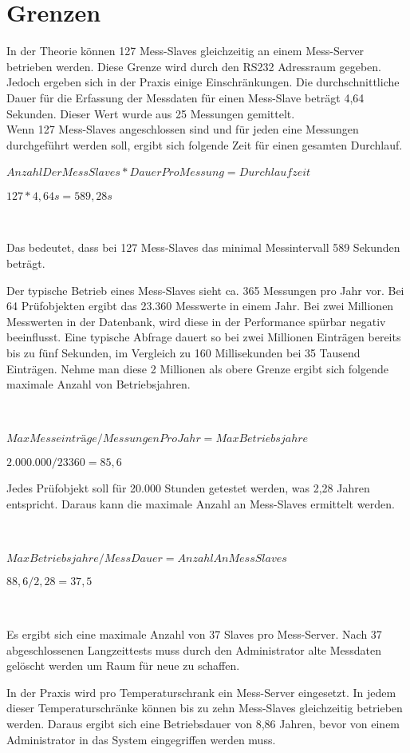 \section{Grenzen}

In der Theorie können 127 Mess-Slaves gleichzeitig an einem Mess-Server betrieben werden. Diese Grenze wird durch den RS232 Adressraum gegeben. Jedoch ergeben sich in der Praxis einige Einschränkungen. Die durchschnittliche Dauer für die Erfassung der Messdaten für einen Mess-Slave beträgt 4,64 Sekunden. Dieser Wert wurde aus 25 Messungen gemittelt.\\
Wenn 127 Mess-Slaves angeschlossen sind und für jeden eine Messungen durchgeführt werden soll, ergibt sich folgende Zeit für einen gesamten Durchlauf.\ 

\newpage
\begin{center}
{\large$AnzahlDerMessSlaves * DauerProMessung = Durchlaufzeit$}\ 


{\large$127 * 4,64 s = 589,28 s$}
\end{center}\ 

Das bedeutet, dass bei 127 Mess-Slaves das minimal Messintervall 589 Sekunden beträgt.\ 

Der typische Betrieb eines Mess-Slaves sieht ca. 365 Messungen pro Jahr vor. Bei 64 Prüfobjekten ergibt das 23.360 Messwerte in einem Jahr. Bei zwei Millionen Messwerten in der Datenbank, wird diese in der Performance spürbar negativ beeinflusst. Eine typische Abfrage dauert so bei zwei Millionen Einträgen bereits bis zu fünf Sekunden, im Vergleich zu 160 Millisekunden bei 35 Tausend Einträgen. Nehme man diese 2 Millionen als obere Grenze ergibt sich folgende maximale Anzahl von Betriebsjahren.

\ 
\begin{center}
{\large$MaxMesseinträge / MessungenProJahr = MaxBetriebsjahre$}\ 


{\large$2.000.000 / 23360 = 85,6$}
\end{center}
Jedes Prüfobjekt soll für 20.000 Stunden getestet werden, was 2,28 Jahren entspricht. Daraus kann die maximale Anzahl an Mess-Slaves ermittelt werden.\ 

\ 
\begin{center}
{\large$MaxBetriebsjahre / MessDauer = AnzahlAnMessSlaves$}\ 


{\large$88,6 / 2,28 = 37,5$}
\end{center}\ 

Es ergibt sich eine maximale Anzahl von 37 Slaves pro Mess-Server. Nach 37 abgeschlossenen Langzeittests muss durch den Administrator alte Messdaten gelöscht werden um Raum für neue zu schaffen.\ 

In der Praxis wird pro Temperaturschrank ein Mess-Server eingesetzt. In jedem dieser Temperaturschränke können bis zu zehn Mess-Slaves gleichzeitig betrieben werden. Daraus ergibt sich eine Betriebsdauer von 8,86 Jahren, bevor von einem Administrator in das System eingegriffen werden muss.